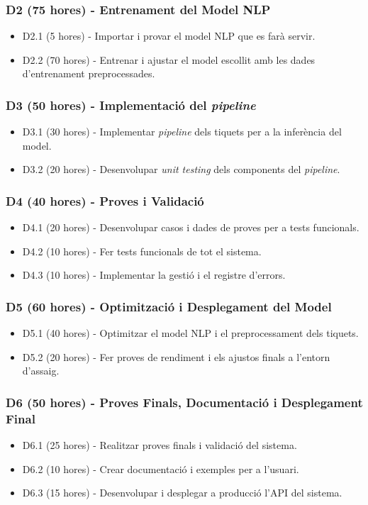 \subsubsection{D2 (75 hores) - Entrenament del Model NLP}
\begin{itemize}
    \item D2.1 (5 hores) - Importar i provar el model NLP que es farà servir.
    \item D2.2 (70 hores) - Entrenar i ajustar el model escollit amb les dades d'entrenament preprocessades.
\end{itemize}

\subsubsection{D3 (50 hores) - Implementació del \textit{pipeline}}
\begin{itemize}
    \item D3.1 (30   hores) - Implementar \textit{pipeline} dels tiquets per a la inferència del model.
    \item D3.2 (20 hores) - Desenvolupar \textit{unit testing} dels components del \textit{pipeline}.
\end{itemize}

\subsubsection{D4 (40 hores) - Proves i Validació}
\begin{itemize}
    \item D4.1 (20 hores) - Desenvolupar casos i dades de proves per a tests funcionals.
    \item D4.2 (10 hores) - Fer tests funcionals de tot el sistema.
    \item D4.3 (10 hores) - Implementar la gestió i el registre d'errors.
\end{itemize}

\subsubsection{D5 (60 hores) - Optimització i Desplegament del Model}
\begin{itemize}
    \item D5.1 (40 hores) - Optimitzar el model NLP i el preprocessament dels tiquets.
    \item D5.2 (20 hores) - Fer proves de rendiment i els ajustos finals a l'entorn d'assaig.
\end{itemize}

\subsubsection{D6 (50 hores) - Proves Finals, Documentació i Desplegament Final}
\begin{itemize}
    \item D6.1 (25 hores) - Realitzar proves finals i validació del sistema.
    \item D6.2 (10 hores) - Crear documentació i exemples per a l'usuari.
    \item D6.3 (15 hores) - Desenvolupar i desplegar a producció l'API del sistema.
\end{itemize}

